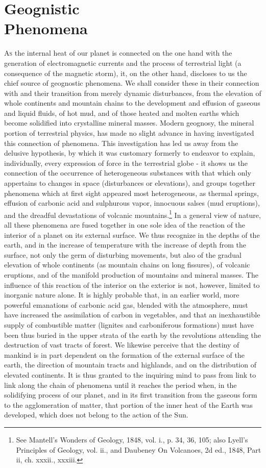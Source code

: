 
\chapter{Geognistic\\Phenomena}

\lettrine[lines=4]{\goudy A}{s} the internal heat of our planet is connected on the one hand with the generation of electromagnetic currents and the process of terrestrial light (a consequence of the magnetic storm), it, on the other hand, discloses to us the chief source of geognostic phenomena. We shall consider these in their connection with and their transition from merely dynamic disturbances, from the elevation of whole continents and mountain chains to the development and effusion of gaseous and liquid fluids, of hot mud, and of those heated and molten earths which become solidified into crystalline mineral masses. Modern geognosy, the mineral portion of terrestrial physics, has made no slight advance in having investigated this connection of phenomena. This investigation has led us away from the delusive hypothesis, by which it was customary formerly to endeavor to explain, individually, every expression of force in the terrestrial globe - it shows us the connection of the occurrence of heterogeneous substances with that which only appertains to changes in space (disturbances or elevations), and groups together phenomena which at first sight appeared most heterogeneous, as thermal springs, effusion of carbonic acid and sulphurous vapor, innocuous salses (mud eruptions), and the dreadful devastations of volcanic mountains.\footnote{See Mantell's Wonders of Geology, 1848, vol. i., p. 34, 36, 105; also Lyell's Principles of Geology, vol. ii., and Daubeney On Volcanoes, 2d ed., 1848, Part ii, ch. xxxii., xxxiii.} In a general view of nature, all these phenomena are fused together in one sole idea of the reaction of the interior of a planet on its external surface. We thus recognize in the depths of the earth, and in the increase of temperature with the increase of depth from the surface, not only the germ of disturbing movements, but also of the gradual elevation of whole continents (as mountain chains on long fissures), of volcanic eruptions, and of the manifold production of mountains and mineral masses. The influence of this reaction of the interior on the exterior is not, however, limited to inorganic nature alone. It is highly probable that, in an earlier world, more powerful emanations of carbonic acid gas, blended with the atmosphere, must have increased the assimilation of carbon in vegetables, and that an inexhaustible supply of combustible matter (lignites and carboniferous formations) must have been thus buried in the upper strata of the earth by the revolutions attending the destruction of vast tracts of forest. We likewise perceive that the destiny of mankind is in part dependent on the formation of the external surface of the earth, the direction of mountain tracts and highlands, and on the distribution of elevated continents. It is thus granted to the inquiring mind to pass from link to link along the chain of phenomena until it reaches the period when, in the solidifying process of our planet, and in its first transition from the gaseous form to the agglomeration of matter, that portion of the inner heat of the Earth was developed, which does not belong to the action of the Sun.